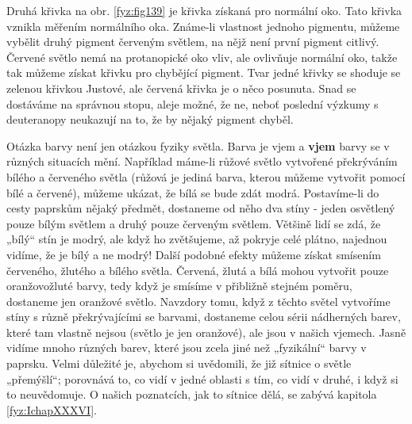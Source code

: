 {    Druhá křivka na obr. \ref{fyz:fig139} je křivka získaná pro normální oko. Tato křivka vznikla 
    měřením normálního oka. Známe-li vlastnost jednoho pigmentu, můžeme vybělit druhý pigment 
    červeným světlem, na nějž není první pigment citlivý. Červené světlo nemá na protanopické oko 
    vliv, ale ovlivňuje normální oko, takže tak můžeme získat křivku pro chybějící pigment. Tvar 
    jedné křivky se shoduje se zelenou křivkou Justové, ale červená křivka je o něco posunuta. Snad 
    se dostáváme na správnou stopu, aleje možné, že ne, neboť poslední výzkumy s deuteranopy 
    neukazují na to, že by nějaký pigment chyběl.
    
    Otázka barvy není jen otázkou fyziky světla. Barva je vjem a \textbf{vjem} barvy se v různých 
    situacích mění. Například máme-li růžové světlo vytvořené překrýváním bílého a červeného světla 
    (růžová je jediná barva, kterou můžeme vytvořit pomocí bílé a červené), můžeme ukázat, že bílá 
    se bude zdát modrá. Postavíme-li do cesty paprskům nějaký předmět, dostaneme od něho dva stíny 
    - jeden osvětlený pouze bílým světlem a druhý pouze červeným světlem. Většině lidí se zdá, že 
    „bílý“ stín je modrý, ale když ho zvětšujeme, až pokryje celé plátno, najednou vidíme, že je 
    bílý a ne modrý! Další podobné efekty můžeme získat smísením červeného, žlutého a bílého 
    světla. Červená, žlutá a bílá mohou vytvořit pouze oranžovožluté barvy, tedy když je smísíme v 
    přibližně stejném poměru, dostaneme jen oranžové světlo. Navzdory tomu, když z těchto světel 
    vytvoříme stíny s různě překrývajícími se barvami, dostaneme celou sérii nádherných barev, 
    které tam vlastně nejsou (světlo je jen oranžové), ale jsou v našich vjemech. Jasně vidíme 
    mnoho různých barev, které jsou zcela jiné než „fyzikální“ barvy v paprsku. Velmi důležité je, 
    abychom si uvědomili, že již sítnice o světle „přemýšlí“; porovnává to, co vidí v jedné oblasti 
    s tím, co vidí v druhé, i když si to neuvědomuje. O našich poznatcích, jak to sítnice dělá, se 
    zabývá kapitola \ref{fyz:IchapXXXVI}. 
    

} %
\printbibliography[heading=subbibliography]
